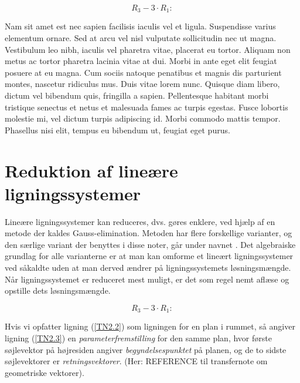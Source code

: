 \begin{equation} R_3 - 3\cdot R_1: \nonumber \end{equation}


Nam sit amet est nec sapien facilisis iaculis vel et ligula. Suspendisse varius elementum ornare. Sed at arcu vel nisl vulputate sollicitudin nec ut magna. Vestibulum leo nibh, iaculis vel pharetra vitae, placerat eu tortor. Aliquam non metus ac tortor pharetra lacinia vitae at dui. Morbi in ante eget elit feugiat posuere at eu magna. Cum sociis natoque penatibus et magnis dis parturient montes, nascetur ridiculus mus. Duis vitae lorem nunc. Quisque diam libero, dictum vel bibendum quis, fringilla a sapien. Pellentesque habitant morbi tristique senectus et netus et malesuada fames ac turpis egestas. Fusce lobortis molestie mi, vel dictum turpis adipiscing id. Morbi commodo mattis tempor. Phasellus nisi elit, tempus eu bibendum ut, feugiat eget purus.


\section{Reduktion af lineære ligningssystemer}
Lineære ligningssystemer kan reduceres, dvs. gøres enklere, ved hjælp af en metode der kaldes Gauss-elimination. Metoden har flere forskellige varianter, og den særlige variant der benyttes i disse noter, går under navnet . Det algebraiske grundlag for alle varianterne er at man kan omforme et lineært ligningssy\-stemer ved såkaldte  uden at man derved ændrer på ligningssystemets løsningsmængde. Når ligningssystemet er reduceret mest muligt, er det som regel nemt aflæse og opstille dets løsningsmængde.



\begin{obs}
\begin{equation} R_3 - 3\cdot R_1: \nonumber \end{equation}


Hvis vi opfatter ligning (\ref{TN2.2}) som ligningen for en plan i rummet, så angiver ligning (\ref{TN2.3}) en \textit{parameterfremstilling} for den samme plan, hvor første søjlevektor på højresiden angiver \textit{begyndelsespunktet} på planen, og de to sidste søjlevektorer er \textit{retningsvektorer}. (Her: REFERENCE til transfernote om geometriske vektorer).
\end{obs}



